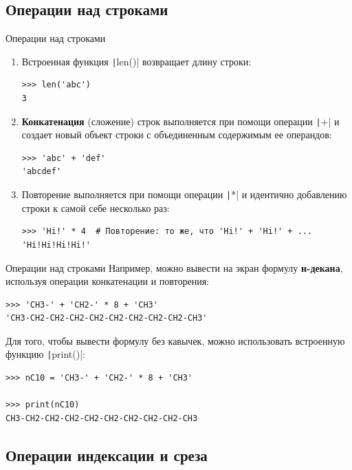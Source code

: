 \documentclass[aspectratio=169, mathserif]{beamer}%
\begin{document}
\subsection{Операции над строками}

\begin{frame}[fragile]{Операции над строками}
\scriptsize
\begin{enumerate}
\item Встроенная функция \texttt|len()| возвращает длину строки:
\begin{verbatim}
>>> len('abc')
3
\end{verbatim}
\item \textcolor{extraorange}{\textbf{Конкатенация}} (сложение) строк выполняется при помощи операции \texttt|+| и создает новый объект строки с объединенным содержимым ее операндов:
\begin{verbatim}
>>> 'abc' + 'def'
'abcdef'
\end{verbatim}
\item Повторение выполняется при помощи операции \texttt|*| и идентично добавлению строки к самой себе несколько раз:

\begin{verbatim}
>>> 'Hi!' * 4  # Повторение: то же, что 'Hi!' + 'Hi!' + ... 
'Hi!Hi!Hi!Hi!'
\end{verbatim}
\end{enumerate}
\vfill
\end{frame}


\begin{frame}[fragile]{Операции над строками}
\scriptsize
Например, можно вывести на экран формулу \textbf{н-декана}, используя операции конкатенации и повторения:
\begin{verbatim}
>>> 'CH3-' + 'CH2-' * 8 + 'CH3'  
'CH3-CH2-CH2-CH2-CH2-CH2-CH2-CH2-CH2-CH3'
\end{verbatim}

Для того, чтобы вывести формулу без кавычек, можно использовать встроенную функцию \texttt|print()|:

\begin{verbatim}
>>> nC10 = 'CH3-' + 'CH2-' * 8 + 'CH3'

>>> print(nC10) 
CH3-CH2-CH2-CH2-CH2-CH2-CH2-CH2-CH2-CH3
\end{verbatim}
\vfill
\end{frame}


\subsection{Операции индексации и среза}
\end{document}
